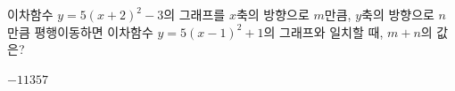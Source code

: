 이차함수 $y=5(x+2)^2-3$의 그래프를 $x$축의 방향으로 $m$만큼, $y$축의 방향으로 $n$만큼 평행이동하면 이차함수 $y=5(x-1)^2+1$의 그래프와 일치할 때, $m+n$의 값은?
\begin{choices32}{$-1$}{$1$}{$3$}{$5$}{$7$}\end{choices32}
